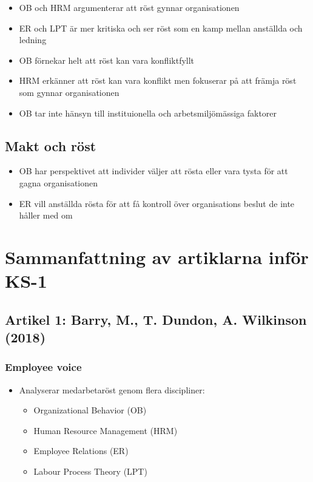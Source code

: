 \documentclass[12pt]{article}
\begin{document}
\begin{itemize}
    \item OB och HRM argumenterar att röst gynnar organisationen
    \item ER och LPT är mer kritiska och ser röst som en kamp mellan anställda och ledning
    \item OB förnekar helt att röst kan vara konfliktfyllt
    \item HRM erkänner att röst kan vara konflikt men fokuserar på att främja röst som gynnar organisationen
    \item OB tar inte hänsyn till instituionella och arbetsmiljömässiga faktorer
\end{itemize}

\subsection{Makt och röst}
\begin{itemize}
    \item OB har perspektivet att individer väljer att rösta eller vara tysta för att gagna organisationen
    \item ER vill anställda rösta för att få kontroll över organisations beslut de inte håller med om
\end{itemize}


\newpage
\section{Sammanfattning av artiklarna inför KS-1}
\subsection{Artikel 1: Barry, M., T. Dundon, A. Wilkinson (2018)}
\subsubsection{Employee voice}
\begin{itemize}
    \item Analyserar medarbetaröst genom flera discipliner:
    \begin{itemize}
        \item Organizational Behavior (OB)
        \item Human Resource Management (HRM)
        \item Employee Relations (ER)
        \item Labour Process Theory (LPT)
    \end{itemize}
\end{itemize}
\end{document}
